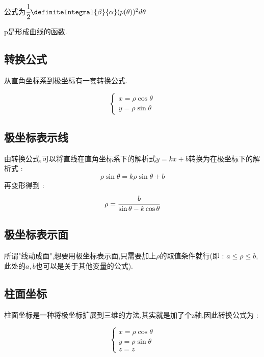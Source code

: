 {{{    公式为$\cfrac{1}{2}\definiteIntegral{\beta}{\alpha}(p(\theta))^2d\theta$

    p是形成曲线的函数.
    }%

    \subsection{转换公式}{
        从直角坐标系到极坐标有一套转换公式.

        $$
            \begin{cases}
                x = \rho\cos\theta \\
                y = \rho\sin\theta
            \end{cases}
        $$
    }%

    \subsection{极坐标表示线}{
        \begin{center}
        \end{center}

        由转换公式,可以将直线在直角坐标系下的解析式$y = kx + b$转换为在极坐标下的解析式 :
        $$
            \rho\sin\theta = k\rho\sin\theta + b
        $$
        再变形得到 :
        $$
            \rho = \cfrac{b}{\sin\theta - k\cos\theta}
        $$
    }%

    \subsection{极坐标表示面}{
        所谓"线动成面",想要用极坐标表示面,只需要加上$\rho$的取值条件就行(即 : $a \leq \rho \leq b$,此处的$a,b$也可以是关于其他变量的公式).
    }%

    \subsection{柱面坐标}{
        柱面坐标是一种将极坐标扩展到三维的方法,其实就是加了个z轴.因此转换公式为 :

        $$
            \begin{cases}
                x = \rho\cos\theta \\
                y = \rho\sin\theta \\
                z = z
            \end{cases}
        $$
    }%

}}
